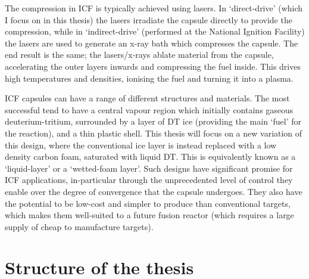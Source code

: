 The compression in ICF is typically achieved using lasers. In `direct-drive' (which I focus on in this thesis) the lasers irradiate the capsule directly to provide the compression, while in `indirect-drive' (performed at the National Ignition Facility) the lasers are used to generate an x-ray bath which compresses the capsule. The end result is the same; the lasers/x-rays ablate material from the capsule, accelerating the outer layers inwards and compressing the fuel inside. This drives high temperatures and densities, ionising the fuel and turning it into a plasma.

ICF capsules can have a range of different structures and materials. The most successful tend to have a central vapour region which initially contains gaseous deuterium-tritium, surrounded by a layer of DT ice (providing the main `fuel' for the reaction), and a thin plastic shell. This thesis will focus on a new variation of this design, where the conventional ice layer is instead replaced with a low density carbon foam, saturated with liquid DT. This is equivalently known as a `liquid-layer' or a `wetted-foam layer'. Such designs have significant promise for ICF applications, in-particular through the unprecedented level of control they enable over the degree of convergence that the capsule undergoes. They also have the potential to be low-cost and simpler to produce than conventional targets, which makes them well-suited to a future fusion reactor (which requires a large supply of cheap to manufacture targets). 

\section{Structure of the thesis}

